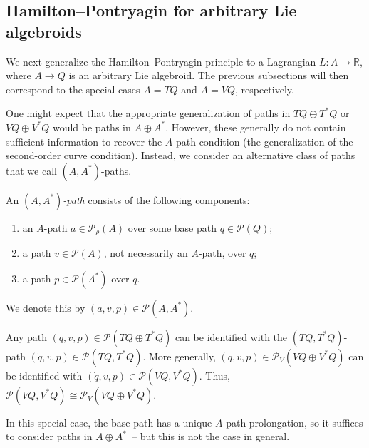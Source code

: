 \documentclass[pdftex]{sigma}
\numberwithin{equation}{section}
\begin{document}
\subsection{Hamilton--Pontryagin for arbitrary Lie algebroids}\label{sec:hpAlgebroids}

We next generalize the Hamilton--Pontryagin principle to a Lagrangian $ L \colon A \rightarrow \mathbb{R} $, where $A \rightarrow Q $ is an arbitrary Lie algebroid. The previous subsections will then correspond to the special cases $ A = T Q $ and $ A = V Q $, respectively.

One might expect that the appropriate generalization of paths in $ T Q \oplus T ^\ast Q $ or $ V Q \oplus V ^\ast Q $ would be paths in $ A \oplus A ^\ast $. However, these generally do not contain suf\/f\/icient information to recover the $A$-path condition (the generalization of the second-order curve condition). Instead, we consider an alternative class of paths that we call $ ( A, A ^\ast ) $-paths.

\begin{Definition} An \emph{$ ( A, A ^\ast ) $-path} consists of the following components:
\begin{enumerate}[label=(\roman*)]\itemsep=0pt
\item an $A$-path $ a \in \mathcal{P} _\rho (A) $ over some base path $ q \in \mathcal{P} (Q) $;
\item a path $ v \in \mathcal{P} (A) $, not necessarily an $A$-path, over $q$;
\item a path $ p \in \mathcal{P} ( A ^\ast ) $ over $q$.
\end{enumerate}
We denote this by $ ( a, v, p ) \in \mathcal{P} ( A, A ^\ast ) $.
\end{Definition}

\begin{Example}
Any path $ ( q, v, p ) \in \mathcal{P} ( T Q \oplus T ^\ast Q ) $ can be identif\/ied with the $ ( T Q, T ^\ast Q ) $-path $ ( \dot{q}, v, p ) \in \mathcal{P} ( T Q , T ^\ast Q ) $. More generally, $ ( q, v, p ) \in \mathcal{P} _V ( V Q \oplus V ^\ast Q ) $ can be identif\/ied with $ ( \dot{q}, v, p ) \in \mathcal{P} ( V Q , V ^\ast Q ) $. Thus, $ \mathcal{P} ( VQ , V ^\ast Q ) \cong \mathcal{P} _V ( V Q \oplus V ^\ast Q ) $.

In this special case, the base path has a unique $A$-path prolongation, so it suf\/f\/ices to consider paths in $ A \oplus A ^\ast $~-- but this is not the case in general.
\end{Example}
\end{document}
